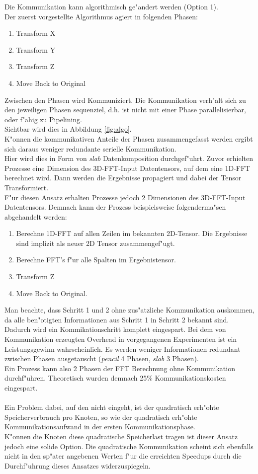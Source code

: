 Die Kommunikation kann algorithmisch ge"andert werden (Option 1).\\
Der zuerst vorgestellte Algorithmus agiert in folgenden Phasen:
\begin{enumerate}
	\item Transform X
	\item Transform Y
	\item Transform Z
	\item Move Back to Original
\end{enumerate}
Zwischen den Phasen wird Kommuniziert. Die Kommunikation verh"alt sich zu den jeweiligen Phasen sequenziel, d.h. ist nicht mit einer Phase parallelisierbar, oder f"ahig zu Pipelining.\\
Sichtbar wird dies in Abbildung \ref{fig:algo}.\\
K"onnen die kommunikativen Anteile der Phasen zusammengefasst werden ergibt sich daraus weniger redundante serielle Kommunikation.\\
Hier wird dies in Form von \textit{slab} Datenkomposition durchgef"uhrt.
Zuvor erhielten Prozesse eine Dimension des 3D-FFT-Input Datentensors, auf dem eine 1D-FFT berechnet wird. Dann werden die Ergebnisse propagiert und dabei der Tensor Transformiert.\\
F"ur diesen Ansatz erhalten Prozesse jedoch 2 Dimensionen des 3D-FFT-Input Datentensors. Demnach kann der Prozess beispielsweise folgenderma"sen abgehandelt werden:
\begin{enumerate}
	\item Berechne 1D-FFT auf allen Zeilen im bekannten 2D-Tensor. Die Ergebnisse sind implizit als neuer 2D Tensor zusammengef"ugt.
	\item Berechne FFT's f"ur alle Spalten im Ergebnistensor.
	\item Transform Z
	\item Move Back to Original.
\end{enumerate}
Man beachte, dass Schritt 1 und 2 ohne zus"atzliche Kommunikation auskommen, da alle ben"otigten Informationen aus Schritt 1 in Schritt 2 bekannt sind.\\
Dadurch wird ein Kommikationschritt komplett eingespart. Bei dem von Kommunikation erzeugten Overhead in vorgegangenen Experimenten ist ein Leistungsgewinn wahrscheinlich.
Es werden weniger Informationen redundant zwischen Phasen ausgetauscht (\textit{pencil} 4 Phasen, \textit{slab} 3 Phasen).\\
Ein Prozess kann also 2 Phasen der FFT Berechnung ohne Kommunikation durchf"uhren. Theoretisch wurden demnach 25\% Kommunikationskosten eingespart.\\
\\
Ein Problem dabei, auf den \cite{mainpaper} nicht eingeht, ist der quadratisch erh"ohte Speicherverbrauch pro Knoten, so wie der quadratisch erh"ohte Kommunikationsaufwand in der ersten Kommunikationsphase.\\
K"onnen die Knoten diese quadratische Speicherlast tragen ist dieser Ansatz jedoch eine solide Option. Die quadratische Kommunikation scheint sich ebenfalls nicht in den sp"ater angebenen Werten f"ur die erreichten Speedups durch die Durchf"uhrung dieses Ansatzes widerzuspiegeln.

